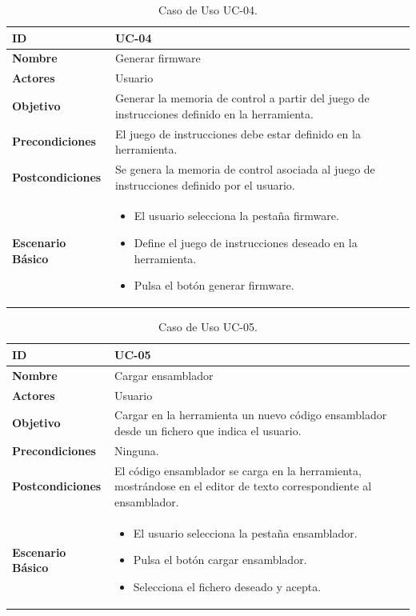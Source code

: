 \begin{center}
\begin{table}[htbp]
\centering
\begin{tabular}{@{}p{2.5cm} p{9cm}@{}} 
\toprule
\textbf{ID}	& UC-04  \\
\midrule
\textbf{Nombre} 		& Generar firmware   \\
\midrule
\textbf{Actores} 		&	Usuario  \\
\midrule
\textbf{Objetivo} 	&	Generar la memoria de control a partir del juego de instrucciones definido en la herramienta. 	 \\
\midrule
\textbf{Precondiciones}	&	El juego de instrucciones debe estar definido en la herramienta.   \\
\midrule
\textbf{Postcondiciones} 	& Se genera la memoria de control asociada al juego de instrucciones definido por el usuario.   \\
\midrule
\textbf{Escenario Básico} 	&  \begin{itemize}
\item El usuario selecciona la pestaña firmware.
\item Define el juego de instrucciones deseado en la herramienta.
\item Pulsa el botón generar firmware.
\end{itemize} \\
\bottomrule
\end{tabular}
\caption{Caso de Uso UC-04.}
\label{tab:uc04}
\end{table}
\end{center}

\begin{center}
\begin{table}[htbp]
\centering
\begin{tabular}{@{}p{2.5cm} p{9cm}@{}} 
\toprule
\textbf{ID}	& UC-05  \\
\midrule
\textbf{Nombre} 		& Cargar ensamblador   \\
\midrule
\textbf{Actores} 		&	Usuario  \\
\midrule
\textbf{Objetivo} 	&	Cargar en la herramienta un nuevo código ensamblador desde un fichero que indica el usuario. 	 \\
\midrule
\textbf{Precondiciones}	&	Ninguna.   \\
\midrule
\textbf{Postcondiciones} 	& El código ensamblador se carga en la herramienta, mostrándose en el editor de texto correspondiente al ensamblador.   \\
\midrule
\textbf{Escenario Básico} 	&  \begin{itemize}
\item El usuario selecciona la pestaña ensamblador.
\item Pulsa el botón cargar ensamblador.
\item Selecciona el fichero deseado y acepta.
\end{itemize} \\
\bottomrule
\end{tabular}
\caption{Caso de Uso UC-05.}
\label{tab:uc05}
\end{table}
\end{center}

